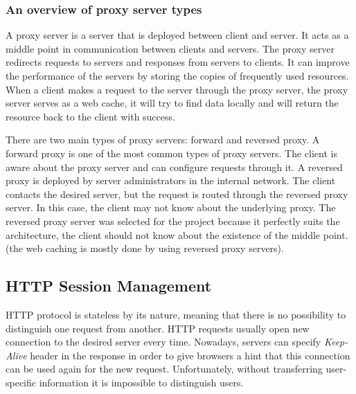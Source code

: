 
\subsubsection{An overview of proxy server types}

A proxy server is a server that is deployed between client and server. It acts as a middle point in communication between clients and servers. The proxy server redirects requests to servers and responses from servers to clients. It can improve the performance of the servers by storing the copies of frequently used resources. When a client makes a request to the server through the proxy server, the  proxy server serves as a web cache, it will try to find data locally and will return the resource back to the client with success.

There are two main types of proxy servers: forward and reversed proxy\cite{WWWCaching}.
A forward proxy is one of the most common types of proxy servers. The client is aware about the proxy server and can configure requests through it.
A reversed proxy is deployed by server administrators in the internal network. The client contacts the desired server, but the request is routed through the reversed proxy server. In this case, the client may not know about the underlying proxy. 
The reversed proxy server was selected for the project because it perfectly suits the architecture, the client should not know about the existence of the middle point. (the web caching is mostly done by using reversed proxy servers).


\subsection{HTTP Session Management}

HTTP protocol is stateless by its nature, meaning that there is no possibility to distinguish one request from another. HTTP requests usually open new connection to the desired server every time. Nowadays, servers can specify \textit{Keep-Alive} header in the response in order to give browsers a hint that this connection can be used again for the new request. Unfortunately, without transferring user-specific information it is impossible to distinguish users.  

